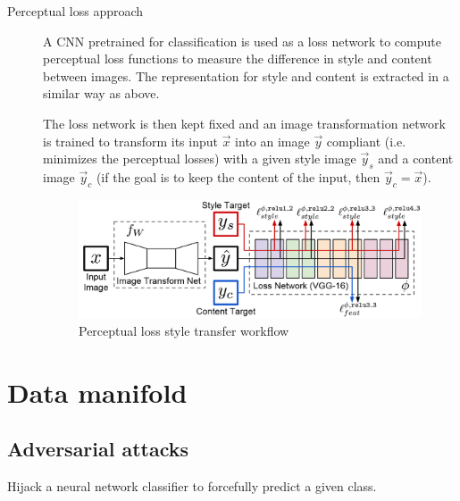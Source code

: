 \begin{description}
    \item[Perceptual loss approach]
        A CNN pretrained for classification is used as a loss network to compute perceptual loss functions
        to measure the difference in style and content between images.
        The representation for style and content is extracted in a similar way as above.

        The loss network is then kept fixed and an image transformation network is trained to transform its input $\vec{x}$ 
        into an image $\vec{y}$ compliant (i.e. minimizes the perceptual losses) with a given style image $\vec{y}_s$ and a content image $\vec{y}_c$ 
        (if the goal is to keep the content of the input, then $\vec{y}_c = \vec{x}$).

        \begin{figure}[H]
            \centering
            \includegraphics[width=0.55\linewidth]{./img/style_transfer_perceptual_loss.png}
            \caption{Perceptual loss style transfer workflow}
        \end{figure}
\end{description}



\section{Data manifold}


\subsection{Adversarial attacks}

Hijack a neural network classifier to forcefully predict a given class.

